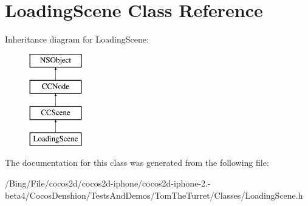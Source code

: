 \hypertarget{interface_loading_scene}{\section{Loading\-Scene Class Reference}
\label{interface_loading_scene}
}
Inheritance diagram for Loading\-Scene\-:\begin{figure}[H]
\begin{center}
\leavevmode
\includegraphics[height=4.000000cm]{interface_loading_scene}
\end{center}
\end{figure}


The documentation for this class was generated from the following file\-:\begin{DoxyCompactItemize}
\item 
/\-Bing/\-File/cocos2d/cocos2d-\/iphone/cocos2d-\/iphone-\/2.-\/beta4/\-Cocos\-Denshion/\-Tests\-And\-Demos/\-Tom\-The\-Turret/\-Classes/Loading\-Scene.\-h\end{DoxyCompactItemize}
